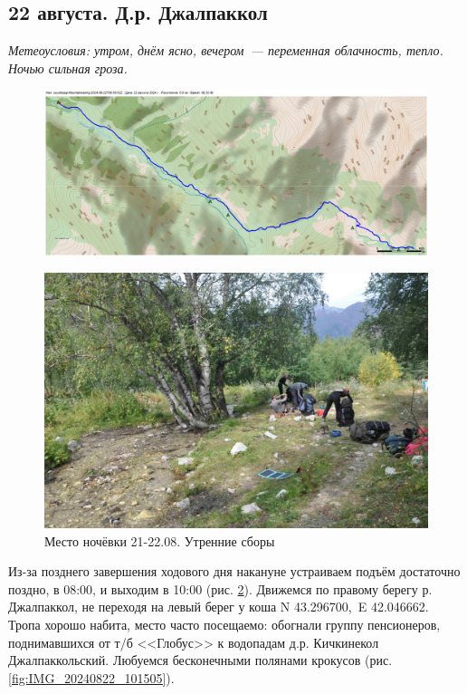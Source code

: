 \subsection{22 августа. Д.р. Джалпаккол}
\textit{Метеоусловия: утром, днём ясно, вечером~--- переменная облачность, тепло. Ночью сильная гроза.}

\begin{figure}[h!]
	\centering
	\includegraphics[angle=0, width=0.7\linewidth]{../pics/mini_maps/22}
	\label{fig:mini_22}
\end{figure}


\begin{figure}[h!]
	\centering
	\includegraphics[width=0.7\linewidth]{../pics/DSC_1181}
	\caption{Место ночёвки 21-22.08. Утренние сборы}
	\label{fig:DSC_1181}
\end{figure}


Из-за позднего завершения ходового дня накануне устраиваем подъём достаточно поздно, в 08:00, и выходим в 10:00 (рис. \ref{fig:DSC_1181}). Движемся по правому берегу р. Джалпаккол, не переходя на левый берег у коша N 43.296700\degree,~E 42.046662\degree. Тропа хорошо набита, место часто посещаемо: обогнали группу пенсионеров, поднимавшихся от т/б <<Глобус>> к водопадам д.р. Кичкинекол Джалпаккольский. Любуемся бесконечными полянами крокусов (рис. \ref{fig:IMG_20240822_101505}).

